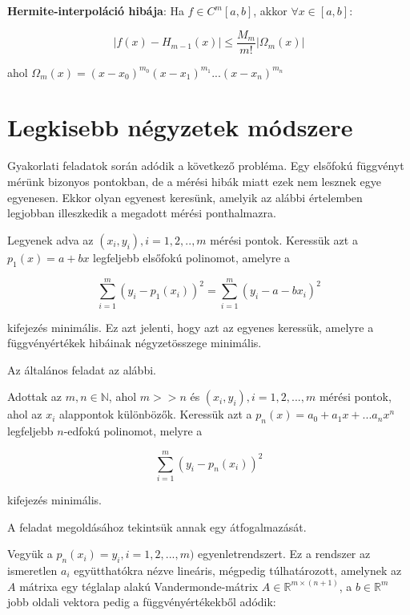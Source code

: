 \documentclass[margin=0px]{article}
\begin{document}
\noindent \textbf{Hermite-interpoláció hibája}: Ha $f \in C^{m}[a,b]$, akkor $\forall x \in [a,b]:$

\begin{displaymath}
    |f(x) - H_{m-1}(x)| \leq \frac{M_{m}}{m!}|\Omega_{m}(x)|
\end{displaymath}

\noindent ahol $\Omega_{m}(x) = (x-x_{0})^{m_{0}}(x-x_{1})^{m_{1}}...(x-x_{n})^{m_{n}}$

\section{Legkisebb négyzetek módszere}

Gyakorlati feladatok során adódik a következő probléma. Egy elsőfokú függvényt mérünk bizonyos pontokban, de
a mérési hibák miatt ezek nem lesznek egye egyenesen. Ekkor olyan egyenest keresünk, amelyik az alábbi
értelemben legjobban illeszkedik a megadott mérési ponthalmazra.

Legyenek adva az $(x_{i},y_{i}), i=1,2,..,m$ mérési pontok. Keressük azt a $p_{1}(x) = a + bx$ legfeljebb
elsőfokú polinomot, amelyre a

\begin{displaymath}
    \displaystyle\sum_{i=1}^{m}(y_{i}-p_{1}(x_{i}))^{2} =
    \displaystyle\sum_{i=1}^{m}(y_{i}- a - bx_{i})^{2}
\end{displaymath}

\noindent kifejezés minimális. Ez azt jelenti, hogy azt az egyenes keressük, amelyre a függvényértékek hibáinak
négyzetösszege minimális.

Az általános feladat az alábbi.

Adottak az $m,n \in \mathbb{N}$, ahol $m >> n$ és $(x_{i},y_{i}), i= 1,2,...,m$ mérési pontok, ahol az $x_{i}$
alappontok különbözők. Keressük azt a $p_{n}(x) = a_{0} + a_{1}x + ... a_{n}x^{n}$ legfeljebb $n$-edfokú
polinomot, melyre a

\begin{displaymath}
    \displaystyle\sum_{i=1}^{m}(y_{i}-p_{n}(x_{i}))^{2}
\end{displaymath}

\noindent kifejezés minimális.

A feladat megoldásához tekintsük annak egy átfogalmazását.

Vegyük a $p_{n}(x_{i}) = y_{i}, i=1,2,...,m)$ egyenletrendszert. Ez a rendszer az ismeretlen $a_{i}$ együtthatókra nézve
lineáris, mégpedig túlhatározott, amelynek az $A$ mátrixa egy téglalap alakú Vandermonde-mátrix $A \in \mathbb{R}^{m \times (n+1)}$,
a $b \in \mathbb{R}^{m}$ jobb oldali vektora pedig a függvényértékekből adódik:
\end{document}
